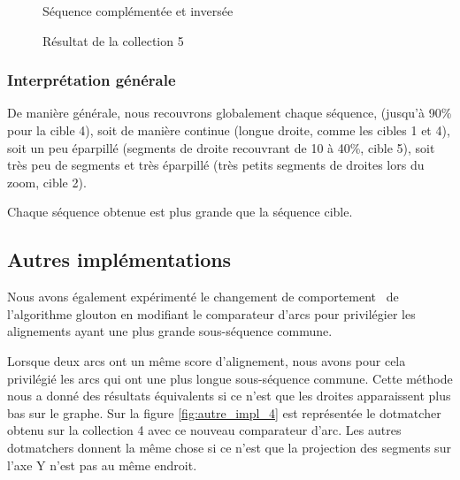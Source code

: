 \begin{figure}[!ht]
\begin{minipage}[c]{.46 \linewidth}
\begin{center}
			 Séquence complémentée et inversée
		\end{center}
	\end{minipage}
	\caption{Résultat de la collection 5}
	\label{cible5}
\end{figure}

\FloatBarrier


\subsubsection*{Interprétation générale}

De manière générale, nous recouvrons globalement chaque séquence, (jusqu'à 90\%
pour la cible 4), soit de manière continue (longue droite, comme les cibles 1 et
4), soit un peu éparpillé (segments de droite recouvrant de 10 à 40\%, cible 5),
soit très peu de segments et très éparpillé (très petits segments de droites lors
du zoom, cible 2).

Chaque séquence obtenue est plus grande que la séquence cible.

\subsection{Autres implémentations}

Nous avons également expérimenté le changement de \og comportement \fg~de l'algorithme glouton en modifiant
le comparateur d'arcs pour privilégier les alignements ayant une plus grande
sous-séquence commune.

Lorsque deux arcs ont un même score d'alignement, nous avons pour cela
privilégié les arcs qui ont une plus longue sous-séquence commune. Cette méthode
nous a donné des résultats équivalents si ce n'est que les droites apparaissent
plus bas sur le graphe. Sur la figure \ref{fig:autre_impl_4} est représentée le
dotmatcher obtenu sur la collection 4 avec ce nouveau comparateur d'arc. Les
autres dotmatchers donnent la même chose si ce n'est que la projection des segments sur l'axe Y n'est pas au même endroit.

